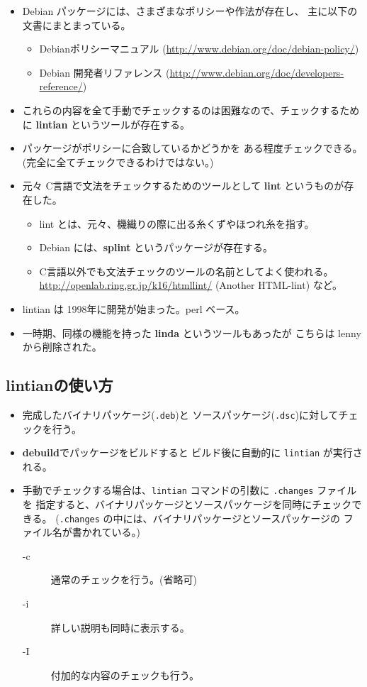 \documentclass[mingoth,a4paper]{jsarticle}
\begin{document}
\begin{itemize}
\item Debian パッケージには、さまざまなポリシーや作法が存在し、
  主に以下の文書にまとまっている。
  \begin{itemize}
  \item Debianポリシーマニュアル
    (\url{http://www.debian.org/doc/debian-policy/})
  \item Debian 開発者リファレンス
    (\url{http://www.debian.org/doc/developers-reference/})
  \end{itemize}
\item これらの内容を全て手動でチェックするのは困難なので、チェックするために
  \textbf{lintian} というツールが存在する。
\item パッケージがポリシーに合致しているかどうかを
  ある程度チェックできる。
  (完全に全てチェックできるわけではない。)
\item 元々 C言語で文法をチェックするためのツールとして
  \textbf{lint} というものが存在した。
  \begin{itemize}
  \item lint とは、元々、機織りの際に出る糸くずやほつれ糸を指す。
  \item Debian には、\textbf{splint} というパッケージが存在する。
  \item C言語以外でも文法チェックのツールの名前としてよく使われる。
    \url{http://openlab.ring.gr.jp/k16/htmllint/} (Another HTML-lint) など。
  \end{itemize}
\item lintian は 1998年に開発が始まった。perl ベース。
\item 一時期、同様の機能を持った \textbf{linda} というツールもあったが
  こちらは lenny から削除された。
\end{itemize}

\subsection{lintianの使い方}

\begin{itemize}
\item 完成したバイナリパッケージ(\texttt{.deb})と
  ソースパッケージ(\texttt{.dsc})に対してチェックを行う。
\item \textbf{debuild}でパッケージをビルドすると
  ビルド後に自動的に \texttt{lintian} が実行される。
\item 手動でチェックする場合は、\texttt{lintian} コマンドの引数に
  \texttt{.changes} ファイルを
  指定すると、バイナリパッケージとソースパッケージを同時にチェックできる。
  (\texttt{.changes} の中には、バイナリパッケージとソースパッケージの
  ファイル名が書かれている。)
  \begin{description}
  \item[-c] 通常のチェックを行う。(省略可)
  \item[-i] 詳しい説明も同時に表示する。
  \item[-I] 付加的な内容のチェックも行う。
  \end{description}
\end{itemize}
\end{document}
